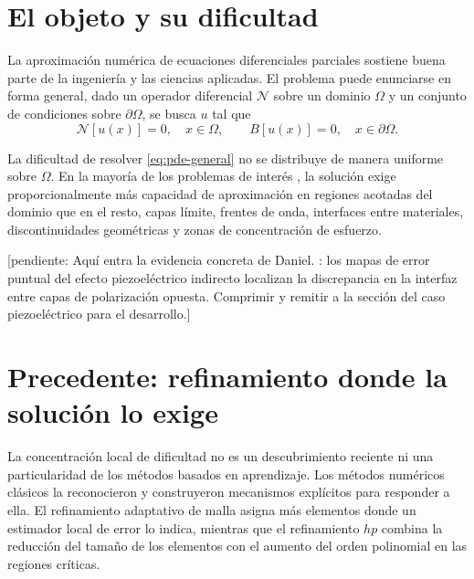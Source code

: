 \newcommand{\pendiente}[1]{\textcolor{red!70!black}{\textsf{[pendiente: #1]}}}

\newcommand{\dom}{\Omega}
\newcommand{\pde}{\mathcal{N}}
\newcommand{\res}{r}
\newcommand{\sig}{s}
\newcommand{\pesof}{w}
\newcommand{\despl}{\bm{d}}
\newcommand{\potel}{\varphi}
\newcommand{\univ}{\psi}

\label{sec:marco-teorico}


\section{El objeto y su dificultad}

La aproximación numérica de ecuaciones diferenciales parciales sostiene buena parte de la ingeniería y las ciencias aplicadas. El problema puede enunciarse en forma general,  dado un operador diferencial $\pde$ sobre un dominio $\dom$ y un conjunto de condiciones sobre $\partial\dom$, se busca $u$ tal que
\begin{equation}
  \pde[u(x)] = 0, \quad x \in \dom, \qquad
  B[u(x)] = 0, \quad x \in \partial\dom .
  \label{eq:pde-general}
\end{equation}

La dificultad de resolver \eqref{eq:pde-general} no se distribuye de manera uniforme sobre $\dom$. En la mayoría de los problemas de interés , la solución exige proporcionalmente más capacidad de aproximación en regiones acotadas del dominio que en el resto, capas límite, frentes de onda, interfaces entre materiales, discontinuidades geométricas y zonas de concentración de esfuerzo.

\pendiente{Aquí entra la evidencia concreta de Daniel. \cite{gonzalez2026pinnpiezo}: los mapas de error puntual del efecto piezoeléctrico indirecto localizan la discrepancia en la interfaz entre capas de polarización opuesta. Comprimir  y remitir a la sección del caso piezoeléctrico para el desarrollo.}


\section{Precedente: refinamiento donde la solución lo exige}

La concentración local de dificultad no es un descubrimiento reciente ni una particularidad de los métodos basados en aprendizaje. Los métodos numéricos clásicos la reconocieron y construyeron mecanismos explícitos para responder a ella. El refinamiento adaptativo de malla asigna más elementos donde un estimador local de error lo indica, mientras que el refinamiento $hp$ combina la reducción del tamaño de los elementos con el aumento del orden polinomial en las regiones críticas.

